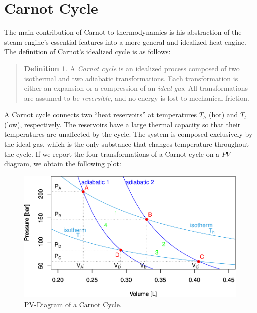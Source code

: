 \documentclass[
  9pt,
]{extbook}
\theoremstyle{definition}
\newtheorem{definition}{Definition}[chapter]
\theoremstyle{definition}
\theoremstyle{definition}
\theoremstyle{remark}
\begin{document}
\hypertarget{carnotcyclesect}{%
\section{Carnot Cycle}\label{carnotcyclesect}}

The main contribution of Carnot to thermodynamics is his abstraction of the steam engine's essential features into a more general and idealized heat engine. The definition of Carnot's idealized cycle is as follows:

\begin{quote}
\begin{definition}
\protect\hypertarget{def:carnotcycle}{}{\label{def:carnotcycle} }
A \emph{Carnot cycle} is an idealized process composed of two isothermal and two adiabatic transformations. Each transformation is either an expansion or a compression of an \emph{ideal gas}. All transformations are assumed to be \emph{reversible}, and no energy is lost to mechanical friction.
\end{definition}
\end{quote}

A Carnot cycle connects two ``heat reservoirs'' at temperatures \(T_h\) (hot) and \(T_l\) (low), respectively. The reservoirs have a large thermal capacity so that their temperatures are unaffected by the cycle. The system is composed exclusively by the ideal gas, which is the only substance that changes temperature throughout the cycle. If we report the four transformations of a Carnot cycle on a \(PV\) diagram, we obtain the following plot:

\begin{figure}

{\centering \includegraphics[width=0.7\linewidth]{pchem1_files/figure-latex/FigCarnotPV-1} 

}

\caption{PV-Diagram of a Carnot Cycle.}\label{fig:FigCarnotPV}
\end{figure}
\end{document}
